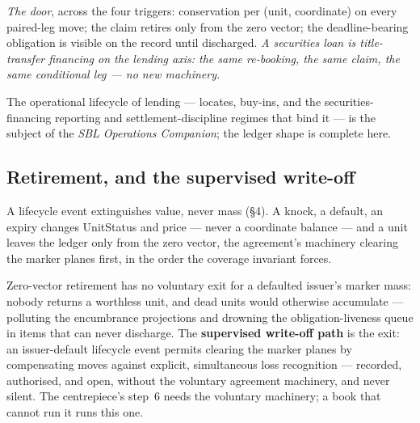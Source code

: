 \emph{The door}, across the four triggers: conservation per (unit, coordinate)
on every paired-leg move; the claim retires only from the zero vector; the
deadline-bearing obligation is visible on the record until discharged.
\emph{A securities loan is title-transfer financing on the lending axis: the
same re-booking, the same claim, the same conditional leg --- no new
machinery.}

\medskip
The operational lifecycle of lending --- locates, buy-ins, and the
securities-financing reporting and settlement-discipline regimes that bind it
--- is the subject of the \emph{SBL Operations Companion}; the ledger shape is
complete here.

\subsection{Retirement, and the supervised write-off}

A lifecycle event extinguishes value, never mass (\S4). A knock, a default, an
expiry changes UnitStatus and price --- never a coordinate balance --- and a
unit leaves the ledger only from the zero vector, the agreement's machinery
clearing the marker planes first, in the order the coverage invariant forces.

Zero-vector retirement has no voluntary exit for a defaulted issuer's marker
mass: nobody returns a worthless unit, and dead units would otherwise
accumulate --- polluting the encumbrance projections and drowning the
obligation-liveness queue in items that can never discharge. The
\textbf{supervised write-off path} is the exit: an issuer-default lifecycle
event permits clearing the marker planes by compensating moves against
explicit, simultaneous loss recognition --- recorded, authorised, and open,
without the voluntary agreement machinery, and never silent. The centrepiece's
step~6 needs the voluntary machinery; a book that cannot run it runs this one.

